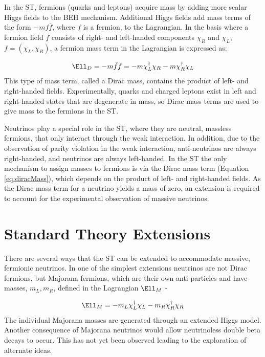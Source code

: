 In the ST, fermions (quarks and leptons) acquire mass by adding more scalar Higgs fields to the 
BEH mechanism.  Additional Higgs fields add mass terms of the form $-mf\bar{f}$, where $f$ is a fermion, to 
the Lagrangian.  In the basis where a fermion field $f$ consists of right- and left-handed components $\chi_{R}$ 
and $\chi_{L}$, $f = (\chi_{L},\chi_{R})$, a fermion mass term in the Lagrangian is expressed as:

\begin{equation}
	\Ell_{D} = -m\bar{f}f = -m\chi^{\dagger}_{L}\chi_{R} - m\chi^{\dagger}_{R}\chi_{L}
	\label{eq:diracMass}
\end{equation}
This type of mass term, called a Dirac mass, contains the product of left- and right-handed fields.  Experimentally, 
quarks and charged leptons exist in left and right-handed states that are degenerate 
in mass, so Dirac mass terms are used to give mass to the fermions in the ST.

Neutrinos play a special role in the ST, where they are neutral, massless fermions, that only interact 
through the weak interaction.  In addition, due to the observation of parity violation in the weak interaction, 
anti-neutrinos are always right-handed, and neutrinos are always left-handed.  In the ST the only mechanism 
to assign masses to fermions is via the Dirac mass term (Equation \ref{eq:diracMass}), which depends on the 
product of left- and right-handed fields.  As the Dirac mass term for a neutrino yields a mass of zero, an 
extension is required to account for the experimental observation of massive neutrinos.


\section{Standard Theory Extensions}
\label{sec:lrsExtensions}
There are several ways that the ST can be extended to accommodate massive, fermionic neutrinos.  In one of the 
simplest extensions neutrinos are not Dirac fermions, but Majorana fermions, which are their own anti-particles 
and have masses, $m_{L},m_{R}$, defined in the Lagrangian $\Ell_{M}$ -

\begin{equation}
	\Ell_{M} = -m_{L}\chi^{\dagger}_{L}\chi_{L} - m_{R}\chi^{\dagger}_{R}\chi_{R}
\end{equation}
The individual Majorana masses are generated through an extended Higgs model.  Another consequence of Majorana 
neutrinos would allow neutrinoless double beta decays to occur.  This has not yet been observed \cite{igexDblBetaDecay,gerdaDblBetaDecay} 
leading to the exploration of alternate ideas.

